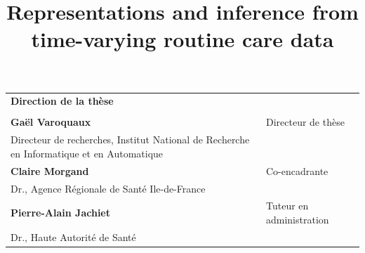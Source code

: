 \documentclass[french,12pt,twoside,a4paper]{book}
\makeatletter
\renewcommand*{\maketitle}{\begingroup%
  \thispagestyle{empty}%
  \raggedleft%
  \vspace*{\baselineskip}
  \textcolor{ared}{\LARGE\bfseries\sffamily \@title}%
  \\[0.067\textheight]%
  \sffamily\Large\@author
  \vfill
  \endgroup}
\makeatother
\begin{document}
\begin{titlepage}
  \medskip
  \begin{tabular}{|p{9cm}l}
    \arrayrulecolor{Prune}
    {\footnotesize \textbf{Direction de la thèse}}                          \\
                                                 &                          \\
    \textbf{Gaël Varoquaux}                      & Directeur de thèse       \\
    Directeur de recherches, Institut National de Recherche en Informatique et
    en Automatique                               &                          \\
    \textbf{Claire Morgand}                      & Co-encadrante            \\
    Dr., Agence Régionale de Santé Ile-de-France &                          \\
    \textbf{Pierre-Alain Jachiet}                & Tuteur en administration \\
    Dr., Haute Autorité de Santé
  \end{tabular}


\end{titlepage}




\title{Representations and inference from time-varying routine care data}
\end{document}
